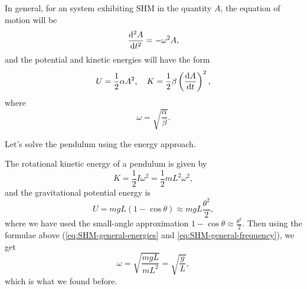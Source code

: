 \documentclass[../classical_mechanics.tex]{subfiles}
\begin{document}
        In general, for an system exhibiting SHM in the quantity $A$, the equation of motion will be
        \begin{equation}
            \dv[2]{A}{t}=-\omega^2A,
        \end{equation}
        and the potential and kinetic energies will have the form
        \begin{equation}\label{eq:SHM-general-energies}
            U=\frac{1}{2}\alpha A^2,\quad K=\frac{1}{2}\beta\left(\dv{A}{t}\right)^2,
        \end{equation}
        where
        \begin{equation}\label{eq:SHM-general-frequency}
            \omega=\sqrt{\frac{\alpha}{\beta}}.
        \end{equation}
        \begin{example}
            Let's solve the pendulum using the energy approach.

            The rotational kinetic energy of a pendulum is given by
            \begin{equation}
                K=\frac{1}{2}I\omega^2=\frac{1}{2}mL^2\omega^2,
            \end{equation}
            and the gravitational potential energy is
            \begin{equation}
                U=mgL(1-\cos\theta)\approx mgL\frac{\theta^2}{2},
            \end{equation}
            where we have used the small-angle approximation $1-\cos\theta\approx\frac{\theta^2}{2}$.
            Then using the formulae above (\ref{eq:SHM-general-energies} and \ref{eq:SHM-general-frequency}), we get
            \begin{equation}
                \omega=\sqrt{\frac{mgL}{mL^2}}=\sqrt{\frac{g}{L}},
            \end{equation}
            which is what we found before.
        \end{example}
        
\end{document}
